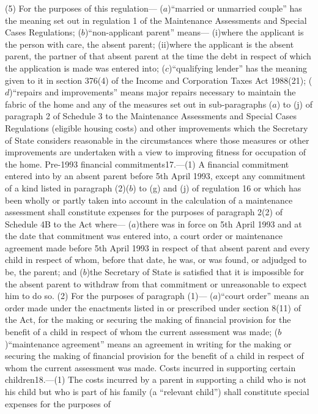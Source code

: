 \documentclass[a4paper]{article}
\begin{document}
(5) For the purposes of this regulation—
($a$)“married or unmarried couple” has the meaning set out in regulation 1 of the
Maintenance Assessments and Special Cases Regulations;
($b$)“non-applicant parent” means—
(i)where the applicant is the person with care, the absent parent;
(ii)where the applicant is the absent parent, the partner of that absent parent
at the time the debt in respect of which the application is made was entered
into;
($c$)“qualifying lender” has the meaning given to it in section 376(4) of the
Income and Corporation Taxes Act 1988(21);
($d$)“repairs and improvements” means major repairs necessary to maintain the
fabric of the home and any of the measures set out in sub-paragraphs ($a$) to (j)
of paragraph 2 of Schedule 3 to the Maintenance Assessments and Special Cases
Regulations (eligible housing costs) and other improvements which the Secretary
of State considers reasonable in the circumstances where those measures or other
improvements are undertaken with a view to improving fitness for occupation of
the home.
Pre-1993 financial commitments17.—(1) A financial commitment entered into by an
absent parent before 5th April 1993, except any commitment of a kind listed in
paragraph (2)($b$) to (g) and (j) of regulation 16 or which has been wholly or
partly taken into account in the calculation of a maintenance assessment shall
constitute expenses for the purposes of paragraph 2(2) of Schedule 4B to the Act
where—
($a$)there was in force on 5th April 1993 and at the date that commitment was
entered into, a court order or maintenance agreement made before 5th April 1993
in respect of that absent parent and every child in respect of whom, before that
date, he was, or was found, or adjudged to be, the parent; and
($b$)the Secretary of State is satisfied that it is impossible for the absent
parent to withdraw from that commitment or unreasonable to expect him to do so.
(2) For the purposes of paragraph (1)—
($a$)“court order” means an order made under the enactments listed in or
prescribed under section 8(11) of the Act, for the making or securing the making
of financial provision for the benefit of a child in respect of whom the current
assessment was made;
($b$)“maintenance agreement” means an agreement in writing for the making or
securing the making of financial provision for the benefit of a child in respect
of whom the current assessment was made.
Costs incurred in supporting certain children18.—(1) The costs incurred by a
parent in supporting a child who is not his child but who is part of his family
(a “relevant child”) shall constitute special expenses for the purposes of
\end{document}

